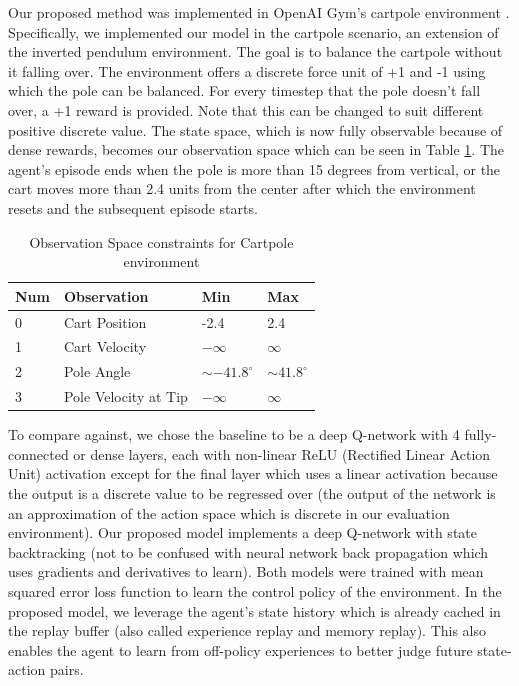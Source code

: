 \documentclass[acmsmall,review,authorversion]{acmart}
\begin{document}
Our proposed method was implemented in OpenAI Gym's cartpole environment \cite{DBLP:journals/corr/BrockmanCPSSTZ16}. Specifically, we implemented our model in the cartpole scenario, an extension of the inverted pendulum environment. The goal is to balance the cartpole without it falling over. The environment offers a discrete force unit of +1 and -1 using which the pole can be balanced. For every timestep that the pole doesn't fall over, a +1 reward is provided. Note that this can be changed to suit different positive discrete value. The state space, which is now fully observable because of dense rewards, becomes our observation space which can be seen in Table \ref{tab:cartpole}. The agent's episode ends when the pole is more than 15 degrees from vertical, or the cart moves more than 2.4 units from the center after which the environment resets and the subsequent episode starts. 

\begin{table}[hbt]
    \begin{tabular}{|l|l|l|l|}
    \hline
    Num & Observation & Min & Max  \\ \hline
    0 & Cart Position & -2.4 & 2.4 \\ \hline
    1   & Cart Velocity & $-\infty$ & $\infty$ \\ \hline
    2   & Pole Angle & $\sim -41.8^\circ$ & $\sim41.8^\circ$ \\ \hline
    3   & Pole Velocity at Tip & $-\infty$ & $\infty$ \\ \hline
    \end{tabular} 
    \caption{Observation Space constraints for Cartpole environment}
    \label{tab:cartpole}
\end{table}

To compare against, we chose the baseline to be a deep Q-network with 4 fully-connected or dense layers, each with non-linear ReLU (Rectified Linear Action Unit) activation except for the final layer which uses a linear activation because the output is a discrete value to be regressed over (the output of the network is an approximation of the action space which is discrete in our evaluation environment). Our proposed model implements a deep Q-network with state backtracking (not to be confused with neural network back propagation which uses gradients and derivatives to learn). Both models were trained with mean squared error loss function to learn the control policy of the environment. In the proposed model, we leverage the agent's state history which is already cached in the replay buffer (also called experience replay and memory replay). This also enables the agent to learn from off-policy experiences to better judge future state-action pairs. 
\end{document}
